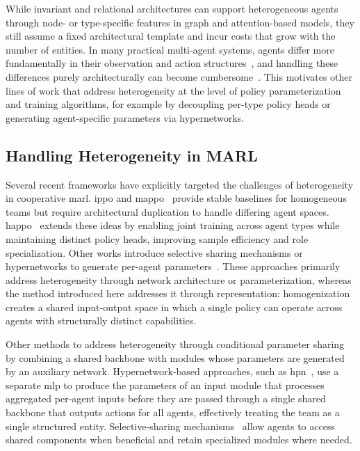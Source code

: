 While invariant and relational architectures can support heterogeneous agents
through node- or type-specific features in graph and attention-based models,
they still assume a fixed architectural template and incur costs that 
grow with the number of entities. In many practical multi-agent systems, 
agents differ more fundamentally in their observation and action 
structures~\cite{calvo2018}, and handling these differences purely 
architecturally can become cumbersome~\cite{cao2012, canese2021, hao2023}. 
This motivates other lines of work that address heterogeneity at 
the level of policy parameterization and training algorithms, 
for example by decoupling per-type policy heads or generating 
agent-specific parameters via hypernetworks.

\subsection{Handling Heterogeneity in MARL}

Several recent frameworks have explicitly targeted the challenges of heterogeneity 
in cooperative \gls{marl}. \Gls{ippo} and \gls{mappo}~\cite{yu2022} 
provide stable baselines for homogeneous teams but require architectural duplication 
to handle differing agent spaces. \Gls{happo}~\cite{zhong2024} 
extends these ideas by enabling joint training across agent types while maintaining 
distinct policy heads, improving sample efficiency and role specialization.
Other works introduce selective sharing mechanisms or hypernetworks to generate 
per-agent parameters~\cite{hao2023, witt2020}. These approaches primarily 
address heterogeneity through network architecture or parameterization, 
whereas the method introduced here addresses it through representation: 
homogenization creates a shared input-output space in which a single 
policy can operate across agents with structurally distinct capabilities.

Other methods to address heterogeneity through conditional parameter sharing by
combining a shared backbone with modules whose parameters are generated 
by an auxiliary network. Hypernetwork-based approaches, such as 
\gls{hpn}~\cite{hao2023}, use a separate \gls{mlp} to produce the 
parameters of an input module that processes aggregated per-agent inputs 
before they are passed through a single shared backbone that outputs actions 
for all agents, effectively treating the team as a single structured entity. 
Selective-sharing mechanisms~\cite{christianos2021} allow agents to 
access shared components when beneficial and retain specialized modules where needed. 

